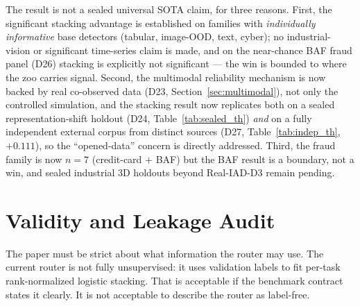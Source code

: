 \documentclass[11pt,titlepage]{article}
\begin{document}
The result is not a sealed universal SOTA claim, for three reasons. First, the
significant stacking advantage is established on families with \emph{individually
informative} base detectors (tabular, image-OOD, text, cyber); no industrial-vision
or significant time-series claim is made, and on the near-chance BAF fraud panel
(D26) stacking is explicitly not significant --- the win is bounded to where the zoo
carries signal. Second, the multimodal reliability mechanism is now backed by real
co-observed data (D23, Section~\ref{sec:multimodal}), not only the controlled
simulation, and the stacking result now replicates both on a sealed representation-shift
holdout (D24, Table~\ref{tab:sealed_th}) \emph{and} on a fully independent external
corpus from distinct sources (D27, Table~\ref{tab:indep_th}, $+0.111$), so the
``opened-data'' concern is directly addressed. Third, the fraud family is now $n{=}7$
(credit-card $+$ BAF) but the BAF result is a boundary, not a win, and sealed
industrial 3D holdouts beyond Real-IAD-D3 remain pending.



\section{Validity and Leakage Audit}

The paper must be strict about what information the router may use. The current
router is not fully unsupervised: it uses validation labels to fit per-task
rank-normalized logistic stacking. That is acceptable if the benchmark contract
states it clearly. It is not acceptable to describe the router as label-free.
\end{document}
